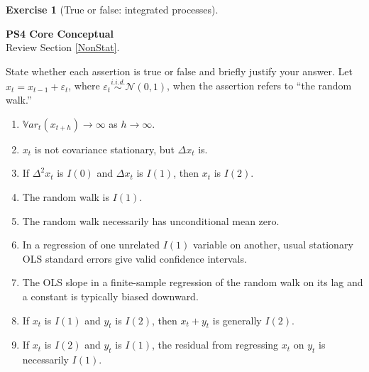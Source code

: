 \documentclass[
  11pt,
]{book}
\providecommand{\tightlist}{%
  \setlength{\itemsep}{0pt}\setlength{\parskip}{0pt}}
\theoremstyle{definition}
\theoremstyle{definition}
\theoremstyle{definition}
\newtheorem{exercise}{Exercise}[chapter]
\theoremstyle{definition}
\theoremstyle{remark}
\begin{document}
\begin{exercisebox}

\begin{exercise}[True or false: integrated processes]
\protect\hypertarget{exr:ex-integration-true-false}{}\label{exr:ex-integration-true-false}

\textbf{PS4 \textbar{} Core \textbar{} Conceptual}\\
Review Section \ref{NonStat}.

State whether each assertion is true or false and briefly justify your answer. Let \(x_t=x_{t-1}+\varepsilon_t\), where \(\varepsilon_t\overset{i.i.d.}{\sim}\mathcal N(0,1)\), when the assertion refers to ``the random walk.''

\begin{enumerate}
\def\labelenumi{\arabic{enumi}.}
\tightlist
\item
  \(\mathbb{V}ar_t(x_{t+h})\to\infty\) as \(h\to\infty\).
\item
  \(x_t\) is not covariance stationary, but \(\Delta x_t\) is.
\item
  If \(\Delta^2x_t\) is \(I(0)\) and \(\Delta x_t\) is \(I(1)\), then \(x_t\) is \(I(2)\).
\item
  The random walk is \(I(1)\).
\item
  The random walk necessarily has unconditional mean zero.
\item
  In a regression of one unrelated \(I(1)\) variable on another, usual stationary OLS standard errors give valid confidence intervals.
\item
  The OLS slope in a finite-sample regression of the random walk on its lag and a constant is typically biased downward.
\item
  If \(x_t\) is \(I(1)\) and \(y_t\) is \(I(2)\), then \(x_t+y_t\) is generally \(I(2)\).
\item
  If \(x_t\) is \(I(2)\) and \(y_t\) is \(I(1)\), the residual from regressing \(x_t\) on \(y_t\) is necessarily \(I(1)\).
\end{enumerate}

\end{exercise}

\end{exercisebox}

\end{document}
